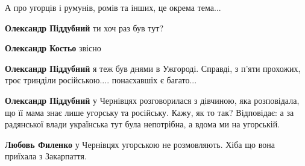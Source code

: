\begin{itemize}
\begin{itemize}
 
А про угорців і румунів, ромів та інших, це окрема тема...

 
\textbf{Олександр Піддубний} ти хоч раз був тут?

 
\textbf{Олександр Костьо} звісно

 
\textbf{Олександр Піддубний} я теж був днями в Ужгороді. Справді, з п'яти прохожих, троє тринділи російською.... понаєхавшіх є багато...

 
\textbf{Олександр Піддубний} у Чернівцях розговорилася з дівчиною, яка
розповідала, що її мама знає лише угорську та російську. Кажу, як то так?
Відповідає: а за радянської влади українська тут була непотрібна, а вдома ми на
угорській.

 
\textbf{Любовь Филенко} у Чернівцях угорською не розмовляють. Хіба що вона приїхала з Закарпаття.


\end{itemize}
\end{itemize}
